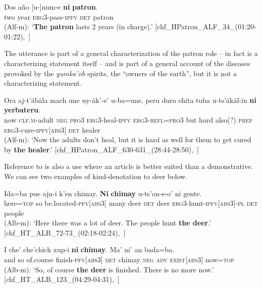 \documentclass[output=paper
,modfonts
,nonflat]{langsci/langscibook}
\begin{document}
\ea \label{ex:pico:50}

\gll Dos a\~no [u-]num-e \textbf{ni} \textbf{patron}.\\
{two} {year} \textsc{erg3}-{pass}-\textsc{ipfv} \textsc{det} {patron}\\
\glt (Alf-m): `\textbf{The patron} lasts 2 years (in charge).' [chf\_HPatron\_ALF\_34\_(01:20-01:22),~\citealt{Delgado-Galvan2018archive}]
\z


The utterance  is part of a general characterization of the patron role -- in fact  is a characterizing statement itself -- and  is part of a general account of the diseases provoked by the \textit{yumka'ob} spirits, the ``owners of the earth'', but it is not a characterizing statement.

\ea \label{ex:pico:51}

\gll Ora aj-t'äbäla mach une uy-äk'-e' u-ba=une, peru duro chita tuba u-ts'äkäl-in \textbf{ni} \textbf{yerbateru}.\\
now \textsc{clf.m}-adult \textsc{neg} \textsc{pro3} \textsc{erg3}-{heal}-\textsc{ipfv} \textsc{erg3}-\textsc{refl}=\textsc{pro3} but {hard} also(?) \textsc{prep} \textsc{erg3}-{cure}-\textsc{ipfv[abs3]} \textsc{det} healer\\
\glt (Alf-m): `Now the adults don't heal, but it is hard as well for them to get cured by \textbf{the healer}.' [chf\_HPatron\_ALF\_630-631\_(28:44-28:50),~\citealt{Delgado-Galvan2018archive}]
\z


Reference to  is also a use where an article is better suited than a demonstrative. We can see two examples of kind-denotation to deer below.

\ea \label{ex:pico:52}

\gll Ida=ba pue ajn-i k'en chimay. \textbf{Ni} \textbf{chimay} u-ts'on-e-o' ni gente. \\
{here}=\textsc{top} {so} {be.located}-\textsc{pfv[abs3]}  {many}  {deer}  \textsc{det} {deer}  \textsc{erg3}-hunt-\textsc{ipfv[abs3]}-\textsc{pl}  \textsc{det}  {people}   \\
\glt (Alb-m): `Here there was a lot of deer. The people hunt \textbf{the deer}.' [chf\_HT\_ALB\_72-73\_(02:18-02:24),~\citealt{Delgado-Galvan2018archive}]
\z


\ea  \label{ex:pico:53}

\gll I che' che'chich  xup-i \textbf{ni} \textbf{chimay}. Ma' ni' an bada=ba.\\
and {so} {of.course} finish-\textsc{pfv[abs3]} \textsc{det} {chimay} \textsc{neg} \textsc{adv} \textsc{exist[abs3]} {now}=\textsc{top}  
\\
\glt (Alb-m): `So, of course \textbf{the deer} is finished. There is no more now.' [chf\_HT\_ALB\_123\_(04:29-04:31),~\citealt{Delgado-Galvan2018archive}]
\end{document}
